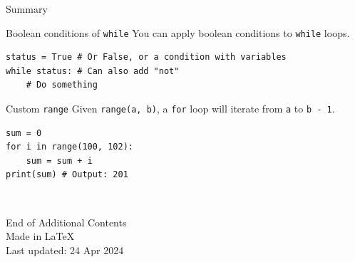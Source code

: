 \documentclass[dvipsnames, svgnames, x11names]{beamer}
\begin{document}
\begin{frame}[fragile]{Summary}
\begin{block}{Boolean conditions of \texttt{while}}
You can apply boolean conditions to \texttt{while} loops.
\begin{verbatim}
status = True # Or False, or a condition with variables
while status: # Can also add "not"
    # Do something
\end{verbatim}
\end{block}

\begin{block}{Custom \texttt{range}}
Given \texttt{range(a, b)}, a \texttt{for} loop will iterate from \texttt{a} to \texttt{b - 1}.
\begin{verbatim}
sum = 0
for i in range(100, 102):
    sum = sum + i
print(sum) # Output: 201
\end{verbatim}
\end{block}
    
\end{frame}

\begin{frame}{ \ }
	\begin{center}
		End of Additional Contents\\
		Made in \LaTeX\\
		Last updated: 24 Apr 2024
	\end{center}
\end{frame}
\end{document}
